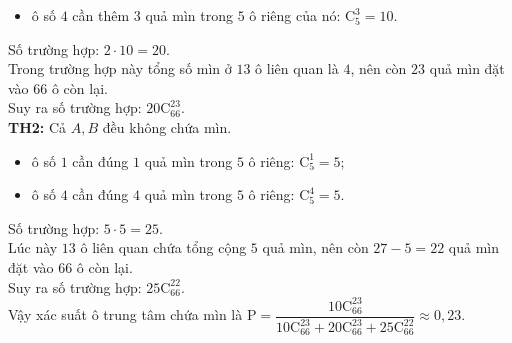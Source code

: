 \begin{ex}
{\begin{itemize}
	\item ô số $4$ cần thêm $3$ quả mìn trong $5$ ô riêng của nó:
	$\mathrm{C}_5^3=10$.
\end{itemize}
Số trường hợp: $2\cdot 10=20$.\\
Trong trường hợp này tổng số mìn ở $13$ ô liên quan là $4$, nên còn $23$ quả mìn đặt vào $66$ ô còn lại.\\
Suy ra số trường hợp: $20\mathrm{C}_{66}^{23}$.\\
\textbf{TH2:} Cả $A,B$ đều không chứa mìn.
\begin{itemize}
	\item ô số $1$ cần đúng $1$ quả mìn trong $5$ ô riêng: $\mathrm{C}_5^1=5$;
	\item ô số $4$ cần đúng $4$ quả mìn trong $5$ ô riêng:
	$\mathrm{C}_5^4=5$.
\end{itemize}
Số trường hợp: $5\cdot5=25$.\\
Lúc này $13$ ô liên quan chứa tổng cộng $5$ quả mìn, nên còn $27-5=22$ quả mìn đặt vào $66$ ô còn lại.\\
Suy ra số trường hợp: $25\mathrm{C}_{66}^{22}$.\\
Vậy xác suất ô trung tâm chứa mìn là
$\mathrm{P}=
\dfrac{10\mathrm{C}_{66}^{23}}
{10\mathrm{C}_{66}^{23}+20\mathrm{C}_{66}^{23}+25\mathrm{C}_{66}^{22}}
\approx 0{,}23$.	
}
\end{ex}

